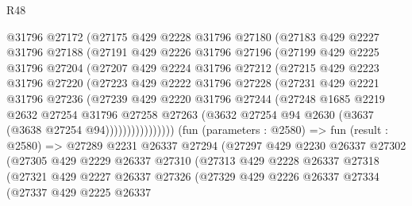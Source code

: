 \begin{lexlean}{R48}
\begin{coremodule}
              @31796
              @27172
              (@27175
                @429
                @2228
                @31796
                @27180
                (@27183
                  @429
                  @2227
                  @31796
                  @27188
                  (@27191
                    @429
                    @2226
                    @31796
                    @27196
                    (@27199
                      @429
                      @2225
                      @31796
                      @27204
                      (@27207
                        @429
                        @2224
                        @31796
                        @27212
                        (@27215
                          @429
                          @2223
                          @31796
                          @27220
                          (@27223
                            @429
                            @2222
                            @31796
                            @27228
                            (@27231
                              @429
                              @2221
                              @31796
                              @27236
                              (@27239
                                @429
                                @2220
                                @31796
                                @27244
                                (@27248
                                  @1685
                                  @2219
                                  @2632
                                  @27254
                                  @31796
                                  @27258
                                  @27263
                                  (@3632 @27254 @94 @2630 (@3637 (@3638 @27254 @94))))))))))))))))
        (fun (parameters : @2580) =>
        fun (result : @2580) =>
        @27289
          @2231
          @26337
          @27294
          (@27297
            @429
            @2230
            @26337
            @27302
            (@27305
              @429
              @2229
              @26337
              @27310
              (@27313
                @429
                @2228
                @26337
                @27318
                (@27321
                  @429
                  @2227
                  @26337
                  @27326
                  (@27329
                    @429
                    @2226
                    @26337
                    @27334
                    (@27337
                      @429
                      @2225
                      @26337

\end{coremodule}
\end{lexlean}
